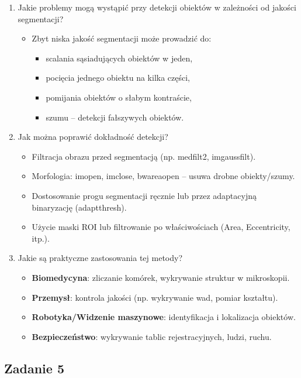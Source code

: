 \begin{enumerate}
	\item Jakie problemy mogą wystąpić przy detekcji obiektów w zależności od jakości segmentacji?
	\begin{itemize}
		\item Zbyt niska jakość segmentacji może prowadzić do:
		\begin{itemize}
			\item scalania sąsiadujących obiektów w jeden,
			\item pocięcia jednego obiektu na kilka części,
			\item pomijania obiektów o słabym kontraście,
			\item szumu – detekcji fałszywych obiektów.
		\end{itemize}
	\end{itemize}
	
	\item Jak można poprawić dokładność detekcji?
	\begin{itemize}
		\item Filtracja obrazu przed segmentacją (np. medfilt2, imgaussfilt).
		\item Morfologia: imopen, imclose, bwareaopen – usuwa drobne obiekty/szumy.
		\item Dostosowanie progu segmentacji ręcznie lub przez adaptacyjną binaryzację (adaptthresh).
		\item Użycie maski ROI lub filtrowanie po właściwościach (Area, Eccentricity, itp.).
	\end{itemize}
	
	\item Jakie są praktyczne zastosowania tej metody?
	\begin{itemize}
		\item \textbf{Biomedycyna}: zliczanie komórek, wykrywanie struktur w mikroskopii.
		\item \textbf{Przemysł}: kontrola jakości (np. wykrywanie wad, pomiar kształtu).
		\item \textbf{Robotyka/Widzenie maszynowe}: identyfikacja i lokalizacja obiektów.
		\item \textbf{Bezpieczeństwo}: wykrywanie tablic rejestracyjnych, ludzi, ruchu.
	\end{itemize}
\end{enumerate}

\subsection{Zadanie 5}

